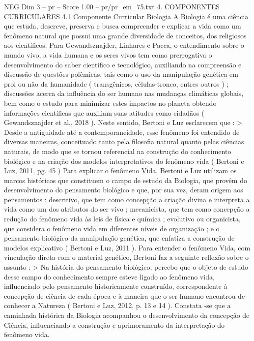 \begin{textsample}{NEG Dim 3 – pr – Score 1.00 – pr/pr\_em\_75.txt}  \label{ex:f3_neg_138}
4.
COMPONENTES CURRICULARES 4.1 Componente Curricular Biologia A Biologia é uma ciência que estuda, descreve, preserva e busca compreender e explicar a vida como um fenômeno natural que possui uma grande diversidade de conceitos, dos religiosos aos científicos.
Para Gewandsznajder, Linhares e Pacca, o entendimento sobre o mundo vivo, a vida humana e os seres vivos tem como prerrogativa o desenvolvimento do saber científico e tecnológico, auxiliando na compreensão e discussão de questões polêmicas, tais como o uso da manipulação genética em prol ou não da humanidade ( transgênicos, células-tronco, entres outros ) ; discussões acerca da influência do ser humano nas mudanças climáticas globais, bem como o estudo para minimizar estes impactos no planeta obtendo informações científicas que auxiliam suas atitudes como cidadãos ( Gewandsznajder et al., 2018 ).
Neste sentido, Bertoni e Luz esclarecem que : > Desde a antiguidade até a contemporaneidade, esse fenômeno foi entendido de diversas maneiras, conceituado tanto pela filosofia natural quanto pelas ciências naturais, de modo que se tornou referencial na construção do conhecimento biológico e na criação dos modelos interpretativos do fenômeno vida ( Bertoni e Luz, 2011, pg. 45 ) Para explicar o fenômeno Vida, Bertoni e Luz utilizam os marcos históricos que constituem o campo de estudo da Biologia, que provêm do desenvolvimento do pensamento biológico e que, por sua vez, deram origem aos pensamentos : descritivo, que tem como concepção a criação divina e interpreta a vida como um dos atributos do ser vivo ; mecanicista, que tem como concepção a redução do fenômeno vida às leis de física e química ; evolutivo ou organicista, que considera o fenômeno vida em diferentes níveis de organização ; e o pensamento biológico da manipulação genética, que enfatiza a construção de modelos explicativo ( Bertoni e Luz, 2011 ).
Para entender o fenômeno Vida, com vinculação direta com o material genético, Bertoni faz a seguinte reflexão sobre o assunto : > Na história do pensamento biológico, percebo que o objeto de estudo desse campo do conhecimento sempre esteve ligado ao fenômeno vida, influenciado pelo pensamento historicamente construído, correspondente à concepção de ciência de cada época e à maneira que o ser humano encontrou de conhecer a Natureza ( Bertoni e Luz, 2012, p. 13 e 14 ).
Constata -se que a caminhada histórica da Biologia acompanhou o desenvolvimento da concepção de Ciência, influenciando a construção e aprimoramento da interpretação do fenômeno vida.

\end{textsample}
